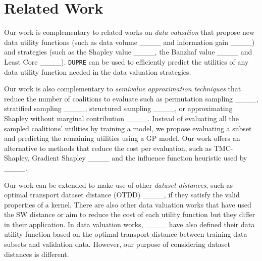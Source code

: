 \section{Related Work}
Our work is complementary to related works on \emph{data valuation} that propose new data utility functions (such as data volume ____ and information gain ____) and strategies (such as the Shapley value ____, the Banzhaf value ____ and Least Core ____). \texttt{DUPRE} can be used to efficiently predict the utilities of any data utility function needed in the data valuation strategies.

Our work is also complementary to \emph{semivalue approximation techniques} that reduce the number of coalitions to evaluate such as permutation sampling ____, stratified sampling ____, structured sampling ____, or approximating Shapley without marginal contribution ____. Instead of evaluating all the sampled coalitions' utilities by training a model, we propose evaluating a subset and predicting the remaining utilities using a GP model. Our work offers an alternative to methods that reduce the cost per evaluation, such as TMC-Shapley, Gradient Shapley ____ and the influence function heuristic used by ____.

Our work can be extended to make use of other \emph{dataset distances}, such as optimal transport dataset distance (OTDD) ____, if they satisfy the valid properties of a kernel. There are also other data valuation works that have used the SW distance or aim to reduce the cost of each utility function but they differ in their application. In data valuation works, ____ have also defined their data utility function based on the optimal transport distance between training data subsets and validation data. However, our purpose of considering dataset distances is different.